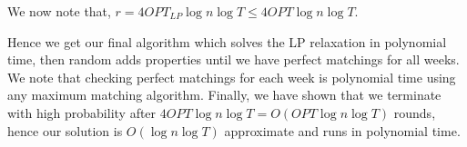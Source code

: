 \documentclass[a4paper]{article}
\begin{document}
We now note that, $r = 4OPT_{LP} \log n \log T \leq 4OPT\log n \log T$.

Hence we get our final algorithm which solves the LP relaxation in polynomial time, 
then random adds properties until we have perfect matchings for all weeks. We note that checking 
perfect matchings for each week is polynomial time using any maximum matching algorithm. Finally, we have shown that we 
terminate with high probability after $4OPT\log n \log T = O(OPT\log n \log T)$ rounds, hence 
our solution is $O(\log n  \log T)$ approximate and runs in polynomial time.
\end{document}
